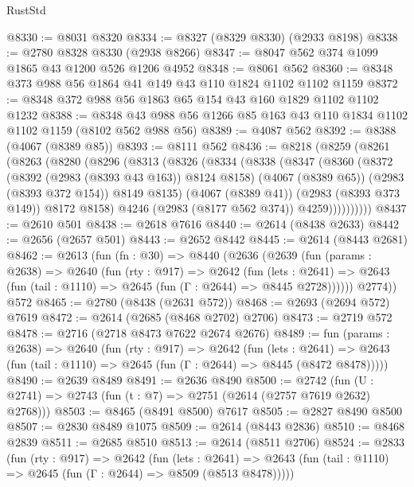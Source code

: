 \begin{lexlean}{RustStd}
\begin{coremodule}
@8330 := @8031 @8320
@8334 := @8327 (@8329 @8330) (@2933 @8198)
@8338 := @2780 @8328 @8330 (@2938 @8266)
@8347 := @8047 @562 @374 @1099 @1865 @43 @1200 @526 @1206 @4952
@8348 := @8061 @562
@8360 := @8348 @373 @988 @56 @1864 @41 @149 @43 @110 @1824 @1102 @1102 @1159
@8372 := @8348 @372 @988 @56 @1863 @65 @154 @43 @160 @1829 @1102 @1102 @1232
@8388 := @8348 @43 @988 @56 @1266 @85 @163 @43 @110 @1834 @1102 @1102 @1159 (@8102 @562 @988 @56)
@8389 := @4087 @562
@8392 := @8388 (@4067 (@8389 @85))
@8393 := @8111 @562
@8436 := @8218
    (@8259
      (@8261
        (@8263
          (@8280
            (@8296
              (@8313
                (@8326
                  (@8334
                    (@8338
                      (@8347
                        (@8360
                          (@8372
                            (@8392 (@2983 (@8393 @43 @163)) @8124 @8158)
                            (@4067 (@8389 @65))
                            (@2983 (@8393 @372 @154))
                            @8149
                            @8135)
                          (@4067 (@8389 @41))
                          (@2983 (@8393 @373 @149))
                          @8172
                          @8158)
                        @4246
                        (@2983 (@8177 @562 @374))
                        @4259))))))))))
@8437 := @2610 @501
@8438 := @2618 @7616
@8440 := @2614 (@8438 @2633)
@8442 := @2656 (@2657 @501)
@8443 := @2652 @8442
@8445 := @2614 (@8443 @2681)
@8462 := @2613
    (fun (fn : @30) =>
    @8440
      (@2636
        (@2639
          (fun (params : @2638) =>
          @2640
            (fun (rty : @917) =>
            @2642
              (fun (lets : @2641) =>
              @2643 (fun (tail : @1110) => @2645 (fun (Γ : @2644) => @8445 @2728))))))
        @2774))
    @572
@8465 := @2780 (@8438 (@2631 @572))
@8468 := @2693 (@2694 @572) @7619
@8472 := @2614 (@2685 (@8468 @2702) @2706)
@8473 := @2719 @572
@8478 := @2716 (@2718 @8473 @7622 @2674 @2676)
@8489 := fun (params : @2638) =>
  @2640
    (fun (rty : @917) =>
    @2642
      (fun (lets : @2641) =>
      @2643 (fun (tail : @1110) => @2645 (fun (Γ : @2644) => @8445 (@8472 @8478)))))
@8490 := @2639 @8489
@8491 := @2636 @8490
@8500 := @2742 (fun (U : @2741) => @2743 (fun (t : @7) => @2751 (@2614 (@2757 @7619 @2632) @2768)))
@8503 := @8465 (@8491 @8500) @7617
@8505 := @2827 @8490 @8500
@8507 := @2830 @8489 @1075
@8509 := @2614 (@8443 @2836)
@8510 := @8468 @2839
@8511 := @2685 @8510
@8513 := @2614 (@8511 @2706)
@8524 := @2833
    (fun (rty : @917) =>
    @2642
      (fun (lets : @2641) =>
      @2643 (fun (tail : @1110) => @2645 (fun (Γ : @2644) => @8509 (@8513 @8478)))))

\end{coremodule}
\end{lexlean}
